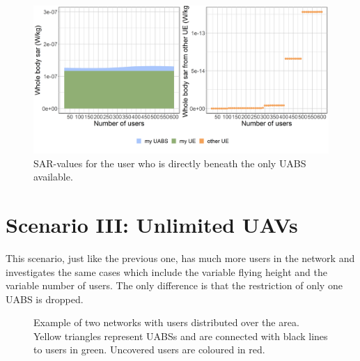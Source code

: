 \begin{figure}[h!]
\centering
  \includegraphics[width=\textwidth/6*5]{../results/s2/uvsulsarcentralUser.png}
  \caption{SAR-values for the user who is directly beneath the only \acs{UABS} available.}
  \label{fig:uvsulsarcentralUsers}
\end{figure}

\section{Scenario III: Unlimited \gls{UAV}s}
\label{s3}

This scenario, just like the previous one, has much more users in the network 
and investigates the same cases which include the variable flying height and the variable number of  users.
The only difference is that the restriction of only one \gls{UABS} is dropped.

\begin{figure}[!htb]
\hfill
{}
\caption{Example of two networks with users distributed over the area. Yellow triangles represent \acs{UABS}s and are connected 
with black lines to users in green. Uncovered users are coloured in red.}
  \label{radpattern2}
\end{figure}

